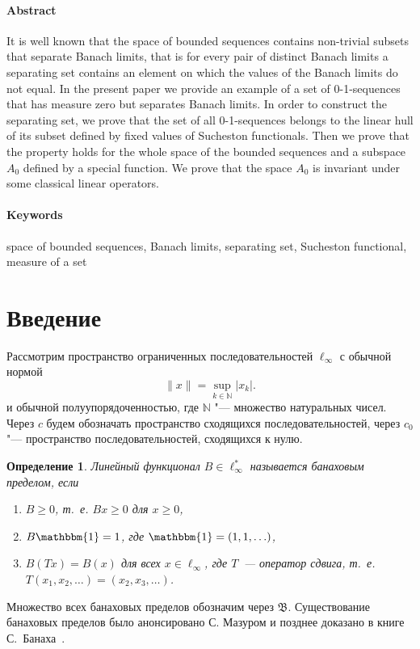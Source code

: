 \documentclass[a4paper,14pt]{article} %
\theoremstyle{plain}
\newtheorem{definition}[lemma]{Определение}
\begin{document}
\paragraph{Abstract}
It is well known that the space of bounded sequences contains non-trivial subsets
that separate Banach limits,
that is
for every pair of distinct Banach limits a separating set contains an element
on which the values of the Banach limits do not equal.
In the present paper we provide an example of a set of 0-1-sequences that has measure zero
but separates Banach limits.
In order to construct the separating set, we prove that
the set of all 0-1-sequences belongs to the linear hull of its subset
defined by fixed values of Sucheston functionals.
Then we prove that the property holds for the whole space of the bounded sequences
and a subspace $A_0$ defined by a special function.
We prove that the space $A_0$ is invariant under some classical linear operators.




\paragraph{Keywords}
	space of bounded sequences,
	Banach limits,
	separating set,
	Sucheston functional,
	measure of a set



\section{Введение}

Рассмотрим пространство ограниченных последовательностей $\ell_\infty$ с обычной нормой
\begin{equation*}
	\|x\| = \sup_{k\in\mathbb{N}} |x_k|
	.
\end{equation*}
и обычной полуупорядоченностью, где $\mathbb{N}$ "--- множество натуральных чисел.
Через $c$ будем обозначать пространство сходящихся последовательностей,
через $c_0$ "--- пространство последовательностей, сходящихся к нулю.


\begin{definition}
	Линейный функционал $B\in \ell_\infty^*$ называется банаховым пределом,
	если
	\begin{enumerate}
		\item
			$B\geq0$, т.~е. $Bx \geq 0$ для $x \geq 0$,
		\item
			$B\mathbbm{1}=1$, где $\mathbbm{1} =(1,1,\ldots)$,
		\item
			$B(Tx)=B(x)$ для всех $x\in \ell_\infty$, где $T$~---
		оператор сдвига, т.~е. $T(x_1,x_2,\ldots)=(x_2,x_3,\ldots)$.
	\end{enumerate}
\end{definition}
Множество всех банаховых пределов обозначим через $\mathfrak{B}$.
Существование банаховых пределов было анонсировано С. Мазуром \cite{Mazur} и позднее доказано в книге С.~Банаха~\cite{B}.
\end{document}
